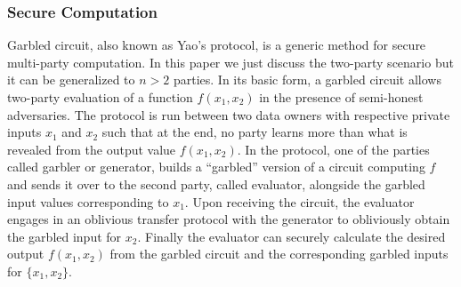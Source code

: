 \subsubsection{Secure Computation}
Garbled circuit, also known as Yao's protocol\cite{Yao,yao2},  is a generic method for secure multi-party computation. In this paper we just discuss the two-party scenario but it can be generalized to $n > 2$ parties. In its basic form, a garbled circuit allows two-party evaluation of a function $f(x_1,x_2)$ in the presence of semi-honest adversaries. The protocol is run between two data owners with respective private inputs $x_1$ and $x_2$ such that at the end, no party learns more  
than what is revealed from the output value $f(x_1,x_2)$. In the protocol, one of the parties called
garbler or generator, builds a “garbled” version of a circuit computing $f$ and sends it over to the second party, called evaluator, alongside the garbled input values 
corresponding to $x_1$.  Upon receiving the circuit, the evaluator 
engages in an oblivious transfer protocol with the generator to obliviously obtain the garbled input for $x_2$. Finally the evaluator can securely calculate the desired output $f(x_1, x_2)$ from the garbled circuit and the corresponding garbled inputs for $\{x_1,x_2\}$.
